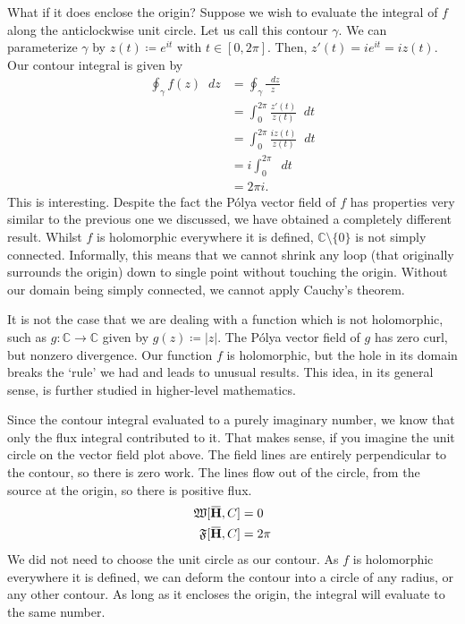 \documentclass[a4paper]{article}
\newcommand*\diff{\mathop{}\!d} %
\newcommand{\C}{\mathbb{C}}
\newcommand{\overbar}[1]{\mkern 1.5mu\overline{\mkern-1.5mu#1\mkern-1.5mu}\mkern 1.5mu}
\theoremstyle{definition}
\begin{document}
What if it does enclose the origin?
Suppose we wish to evaluate the integral of $f$ along the anticlockwise unit circle.
Let us call this contour $\gamma$.
We can parameterize $\gamma$ by $z(t) \coloneq e^{it}$ with $t \in [0, 2\pi]$.
Then, $z'(t) = ie^{it} = iz(t)$.
Our contour integral is given by
\begin{align*}
    \oint_\gamma f(z) \diff z & = \oint_\gamma \frac{\diff z}{z}           \\
                              & = \int_0^{2\pi} \frac{z'(t)}{z(t)} \diff t \\
                              & = \int_0^{2\pi} \frac{iz(t)}{z(t)} \diff t \\
                              & = i \int_0^{2\pi} \diff t                  \\
                              & = 2\pi i.
\end{align*}
This is interesting.
Despite the fact the P\'olya vector field of $f$ has properties very similar to the previous one we discussed, we have obtained a completely different result.
Whilst $f$ is holomorphic everywhere it is defined, $\C \setminus \{0\}$ is not simply connected.
Informally, this means that we cannot shrink any loop (that originally surrounds the origin) down to single point without touching the origin.
Without our domain being simply connected, we cannot apply Cauchy's theorem.

It is not the case that we are dealing with a function which is not holomorphic, such as $g \colon \C \to \C$ given by $g(z) \coloneq \lvert z \rvert$.
The P\'olya vector field of $g$ has zero curl, but nonzero divergence.
Our function $f$ is holomorphic, but the hole in its domain breaks the `rule' we had and leads to unusual results.
This idea, in its general sense, is further studied in higher-level mathematics.

Since the contour integral evaluated to a purely imaginary number, we know that only the flux integral contributed to it.
That makes sense, if you imagine the unit circle on the vector field plot above.
The field lines are entirely perpendicular to the contour, so there is zero work.
The lines flow out of the circle, from the source at the origin, so there is positive flux.
\begin{align*}
    \mathfrak{W}[\mathbf{\overbar{H}}, C] & = 0    \\
    \mathfrak{F}[\mathbf{\overbar{H}}, C] & = 2\pi
\end{align*}
We did not need to choose the unit circle as our contour.
As $f$ is holomorphic everywhere it is defined, we can deform the contour into a circle of any radius, or any other contour.
As long as it encloses the origin, the integral will evaluate to the same number.
\end{document}
